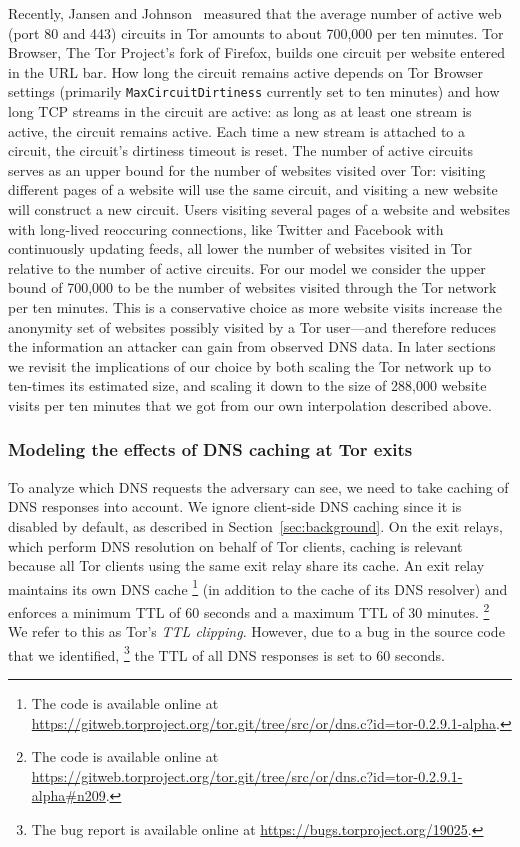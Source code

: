 Recently, Jansen and Johnson~\cite{Jansen2016a} measured that the average number
of active web (port 80 and 443) circuits in Tor amounts to about 700,000 per ten
minutes.
Tor Browser, The Tor Project's fork of Firefox, builds one circuit per
website entered in the URL bar. How long the circuit remains active depends on
Tor Browser settings (primarily {\tt MaxCircuitDirtiness} currently set to ten
minutes) and how long TCP streams in the circuit are active: as long as at
least one stream is active, the circuit remains active.  Each time a new stream
is attached to a circuit, the circuit's dirtiness timeout is reset.
The number of active circuits serves as an
upper bound for the number of websites visited over Tor: visiting different
pages of a website will use the same circuit, and visiting a new website will
construct a new circuit.  Users visiting several pages of a website and websites
with long-lived reoccuring connections, like Twitter and Facebook with
continuously updating feeds,
all lower the number of websites visited in Tor relative to the number of active
circuits.
For our model we consider the upper bound of 700,000 to be the number
of websites visited through the Tor network per ten minutes. This is a
conservative choice as more website visits increase the anonymity set of
websites possibly visited by a Tor user---and therefore reduces the
information an attacker can gain from observed DNS data.
In later sections we revisit the implications of our choice by both
scaling the Tor network up to ten-times its estimated size, and scaling
it down to the size of 288,000 website visits per ten minutes that we
got from our own interpolation described above.

\subsubsection{Modeling the effects of DNS caching at Tor exits}
To analyze which DNS requests the adversary can see, we need to
take caching of DNS responses into account. We ignore client-side DNS
caching since it is disabled by default, as described in
Section~\ref{sec:background}.
On the exit relays, which perform DNS resolution on behalf of Tor clients,
caching is relevant because all Tor clients using the same exit relay share its
cache.  An exit relay maintains its own DNS cache%
\footnote{The code is available online at \url{https://gitweb.torproject.org/tor.git/tree/src/or/dns.c?id=tor-0.2.9.1-alpha}.}
(in addition to the cache of its DNS resolver) and enforces a minimum TTL of 60
seconds and a maximum TTL of 30 minutes.%
\footnote{The code is available online at \url{https://gitweb.torproject.org/tor.git/tree/src/or/dns.c?id=tor-0.2.9.1-alpha\#n209}.}
We refer to this as Tor's \emph{TTL clipping}. However, due to a bug in the
source code that we identified,%
\footnote{The bug report is available online at \url{https://bugs.torproject.org/19025}.}
the TTL of all DNS responses is set to 60 seconds.

